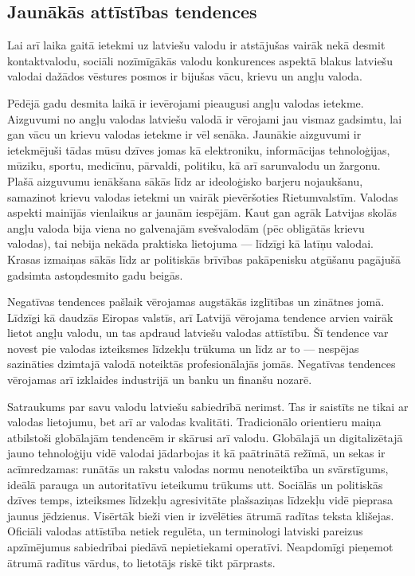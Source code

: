 \begin{multicols}{2}
\subsection{Jaunākās attīstības tendences}

Lai arī laika gaitā ietekmi uz latviešu valodu ir atstājušas vairāk nekā desmit kontaktvalodu, sociāli nozīmīgākās valodu konkurences aspektā blakus latviešu valodai dažādos vēstures posmos ir bijušas vācu, krievu un angļu valoda.

Pēdējā gadu desmita laikā ir ievērojami pieaugusi angļu valodas ietekme.
Aizguvumi no angļu valodas latviešu valodā ir vērojami jau vismaz gadsimtu, lai gan vācu un krievu valodas ietekme ir vēl senāka.
Jaunākie aizguvumi ir ietekmējuši tādas mūsu dzīves jomas kā elektroniku, informācijas tehnoloģijas, mūziku, sportu, medicīnu, pārvaldi, politiku, kā arī sarunvalodu un žargonu.
Plašā aizguvumu ienākšana sākās līdz ar ideoloģisko barjeru nojaukšanu, samazinot krievu valodas ietekmi un vairāk pievēršoties Rietumvalstīm.
Valodas aspekti mainījās vienlaikus ar jaunām iespējām.
Kaut gan agrāk Latvijas skolās angļu valoda bija viena no galvenajām svešvalodām (pēc obligātās krievu valodas), tai nebija nekāda praktiska lietojuma — līdzīgi kā latīņu valodai. 
Krasas izmaiņas sākās līdz ar politiskās brīvības pakāpenisku atgūšanu pagājušā gadsimta astoņdesmito gadu beigās.

Negatīvas tendences pašlaik vērojamas augstākās izglītības un zinātnes jomā. 
Līdzīgi kā daudzās Eiropas valstīs, arī Latvijā vērojama tendence arvien vairāk lietot angļu valodu, un tas apdraud latviešu valodas attīstību. 
Šī tendence var novest pie valodas izteiksmes līdzekļu trūkuma un līdz ar to — nespējas sazināties dzimtajā valodā noteiktās profesionālajās jomās. 
Negatīvas tendences vērojamas arī izklaides industrijā un banku un finanšu nozarē.

Satraukums par savu valodu latviešu sabiedrībā nerimst. 
Tas ir saistīts ne tikai ar valodas lietojumu, bet arī ar valodas kvalitāti. 
Tradicionālo orientieru maiņa atbilstoši globālajām tendencēm ir skārusi arī valodu. 
Globālajā un digitalizētajā jauno tehnoloģiju vidē valodai jādarbojas it kā paātrinātā režīmā, un sekas ir acīmredzamas: runātās un rakstu valodas normu nenoteiktība un svārstīgums, ideālā parauga un autoritatīvu ieteikumu trūkums utt. 
Sociālās un politiskās dzīves temps, izteiksmes līdzekļu agresivitāte plašsaziņas līdzekļu vidē pieprasa jaunus jēdzienus. 
Visērtāk bieži vien ir izvēlēties ātrumā radītas teksta klišejas. 
Oficiāli valodas attīstība netiek regulēta, un terminologi latviski pareizus apzīmējumus sabiedrībai piedāvā nepietiekami operatīvi.
Neapdomīgi pieņemot ātrumā radītus vārdus, to lietotājs riskē tikt pārprasts. 


\end{multicols}
